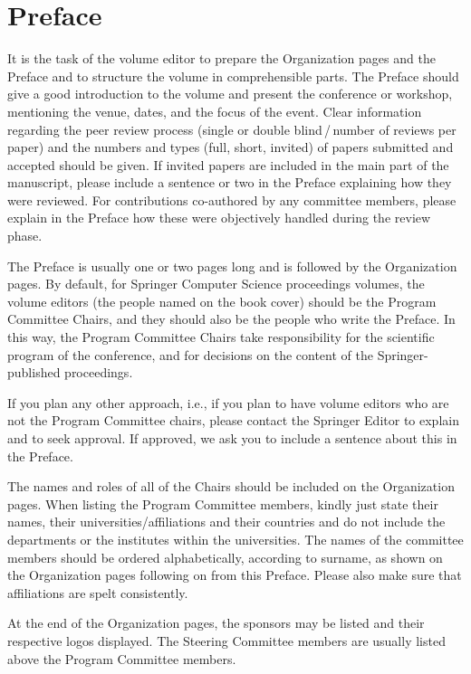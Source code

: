 \documentclass[runningheads]{llncs}
\begin{document}
\frontmatter
\setcounter{page}{5}

\chapter*{Preface}

It is the task of the volume editor to prepare the Organization pages and the
Preface and to structure the volume in comprehensible parts. The Preface
should give a good introduction to the volume and present the conference or
workshop, mentioning the venue, dates, and the focus of the event. Clear
information regarding the peer review process (single or double
blind\,/\,number of reviews per paper) and the numbers and types (full,
short, invited) of papers submitted and accepted should be given. If invited
papers are included in the main part of the manuscript, please include a
sentence or two in the Preface explaining how they were reviewed. For
contributions co-authored by any committee members, please explain in the
Preface how these were objectively handled during the review phase.

The Preface is usually one or two pages long and is followed by the
Organization pages. By default, for Springer Computer Science proceedings
volumes, the volume editors (the people named on the book cover) should be
the Program Committee Chairs, and they should also be the people who write
the Preface. In this way, the Program Committee Chairs take responsibility
for the scientific program of the conference, and for decisions on the
content of the Springer-published proceedings.

If you plan any other approach, i.e., if you plan to have volume editors who
are not the Program Committee chairs, please contact the Springer Editor to
explain and to seek approval. If approved, we ask you to include a sentence
about this in the Preface.

The names and roles of all of the Chairs should be included on the
Organization pages. When listing the Program Committee members, kindly just
state their names, their universities/affiliations and their countries and do
not include the departments or the institutes within the universities. The
names of the committee members should be ordered alphabetically, according to
surname, as shown on the Organization pages following on from this Preface.
Please also make sure that affiliations are spelt consistently.

At the end of the Organization pages, the sponsors may be listed and their
respective logos displayed. The Steering Committee members are usually listed
above the Program Committee members.
\end{document}
